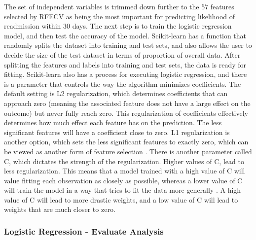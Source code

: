 \documentclass[sigconf]{acmart}
\begin{document}
The set of independent variables is trimmed down further to the 57 features selected by RFECV as being the most important for predicting likelihood of readmission within 30 days. The next step is to train the logistic regression model, and then test the accuracy of the model. Scikit-learn has a function that randomly splits the dataset into training and test sets, and also allows the user to decide the size of the test dataset in terms of proportion of overall data. After splitting the features and labels into training and test sets, the data is ready for fitting.
Scikit-learn also has a process for executing logistic regression, and there is a parameter that controls the way the algorithm minimizes coefficients. The default setting is L2 regularization, which determines coefficients that can approach zero (meaning the associated feature does not have a large effect on the outcome) but never fully reach zero. This regularization of coefficients effectively determines how much effect each feature has on the prediction. The less significant features will have a coefficient close to zero. L1 regularization is another option, which sets the less significant features to exactly zero, which can be viewed as another form of feature selection \cite{cite08}.
There is another parameter called C, which dictates the strength of the regularization. Higher values of C, lead to less regularization. This means that a model trained with a high value of C will value fitting each observation as closely as possible, whereas a lower value of C will train the model in a way that tries to fit the data more generally \cite{cite08}. A high value of C will lead to more drastic weights, and a low value of C will lead to weights that are much closer to zero.

\subsubsection{Logistic Regression - Evaluate Analysis}
\end{document}
